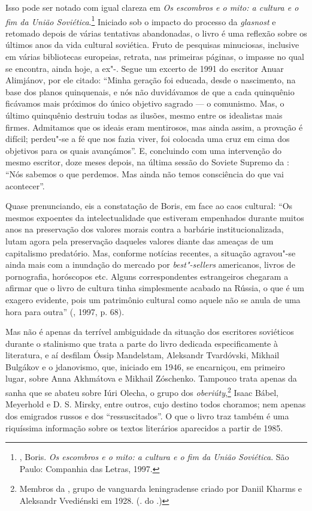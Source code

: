 Isso pode ser notado com igual clareza em \emph{Os escombros e o mito: a
cultura e o fim da União Soviética}.\footnote{, Boris.
  \emph{Os escombros e o mito: a cultura e o fim da União Soviética}.
  São Paulo: Companhia das Letras, 1997.} Iniciado sob o impacto do
processo da \emph{glasnost} e retomado depois de várias tentativas
abandonadas, o livro é uma reflexão sobre os últimos anos da vida
cultural soviética. Fruto de pesquisas minuciosas, inclusive em várias
bibliotecas europeias, retrata, nas primeiras páginas, o impasse no qual
se encontra, ainda hoje, a ex"-. Segue um excerto de 1991 do escritor
Anuar Alimjánov, por ele citado: ``Minha geração foi educada, desde o
nascimento, na base dos planos quinquenais, e nós não duvidávamos de que
a cada quinquênio ficávamos mais próximos do único objetivo sagrado --- o
comunismo. Mas, o último quinquênio destruiu todas as ilusões, mesmo
entre os idealistas mais firmes. Admitamos que os ideais eram
mentirosos, mas ainda assim, a provação é difícil; perdeu"-se a fé que
nos fazia viver, foi colocada uma cruz em cima dos objetivos para os
quais avançámos''. E, concluindo com uma intervenção do mesmo escritor,
doze meses depois, na última sessão do Soviete Supremo da : ``Nós
sabemos o que perdemos. Mas ainda não temos consciência do que vai
acontecer''.

Quase prenunciando, eis a constatação de Boris, em face ao caos cultural:
``Os mesmos expoentes da intelectualidade que estiveram empenhados
durante muitos anos na preservação dos valores morais contra a barbárie
institucionalizada, lutam agora pela preservação daqueles valores diante
das ameaças de um capitalismo predatório. Mas, conforme notícias
recentes, a situação agravou"-se ainda mais com a inundação do mercado
por \emph{best"-sellers} americanos, livros de pornografia, horóscopos
etc. Alguns correspondentes estrangeiros chegaram a afirmar que o livro
de cultura tinha simplesmente acabado na Rússia, o que é um exagero
evidente, pois um patrimônio cultural como aquele não se anula de uma
hora para outra'' (, 1997, p. 68).

Mas não é apenas da terrível ambiguidade da situação dos escritores
soviéticos durante o stalinismo que trata a parte do livro dedicada
especificamente à literatura, e aí desfilam Óssip Mandelstam, Aleksandr
Tvardóvski, Mikhail Bulgákov e o jdanovismo, que, iniciado em 1946, se
encarniçou, em primeiro lugar, sobre Anna Akhmátova e Mikhail Zóschenko.
Tampouco trata apenas da sanha que se abateu sobre Iúri Olecha, o grupo
dos \emph{oberiúty},\footnote{Membros da , grupo de vanguarda leningradense criado por Daniil Kharms e Aleksandr Vvediénski em 1928. (. do .)} Isaac Bábel, Meyerhold e D. S. Mirsky, entre outros, cujo destino todos choramos; nem apenas dos emigrados russos e
dos ``ressuscitados''. O que o livro traz também é uma riquíssima
informação sobre os textos literários aparecidos a partir de 1985.

